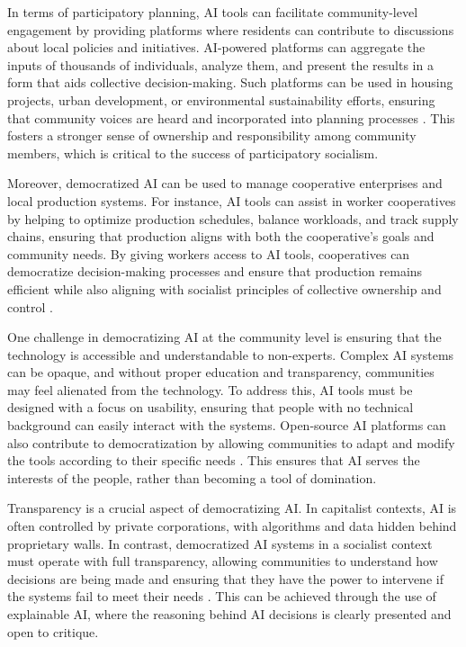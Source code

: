 \begin{refsection}
In terms of participatory planning, AI tools can facilitate community-level engagement by providing platforms where residents can contribute to discussions about local policies and initiatives. AI-powered platforms can aggregate the inputs of thousands of individuals, analyze them, and present the results in a form that aids collective decision-making. Such platforms can be used in housing projects, urban development, or environmental sustainability efforts, ensuring that community voices are heard and incorporated into planning processes \cite[pp.~112-115]{mazzucato2023}. This fosters a stronger sense of ownership and responsibility among community members, which is critical to the success of participatory socialism.

Moreover, democratized AI can be used to manage cooperative enterprises and local production systems. For instance, AI tools can assist in worker cooperatives by helping to optimize production schedules, balance workloads, and track supply chains, ensuring that production aligns with both the cooperative's goals and community needs. By giving workers access to AI tools, cooperatives can democratize decision-making processes and ensure that production remains efficient while also aligning with socialist principles of collective ownership and control \cite[pp.~67-70]{scholz2013}.

One challenge in democratizing AI at the community level is ensuring that the technology is accessible and understandable to non-experts. Complex AI systems can be opaque, and without proper education and transparency, communities may feel alienated from the technology. To address this, AI tools must be designed with a focus on usability, ensuring that people with no technical background can easily interact with the systems. Open-source AI platforms can also contribute to democratization by allowing communities to adapt and modify the tools according to their specific needs \cite[pp.~45-49]{brynjolfsson2014}. This ensures that AI serves the interests of the people, rather than becoming a tool of domination.

Transparency is a crucial aspect of democratizing AI. In capitalist contexts, AI is often controlled by private corporations, with algorithms and data hidden behind proprietary walls. In contrast, democratized AI systems in a socialist context must operate with full transparency, allowing communities to understand how decisions are being made and ensuring that they have the power to intervene if the systems fail to meet their needs \cite[pp.~78-82]{treccani2021}. This can be achieved through the use of explainable AI, where the reasoning behind AI decisions is clearly presented and open to critique.


\end{refsection}
